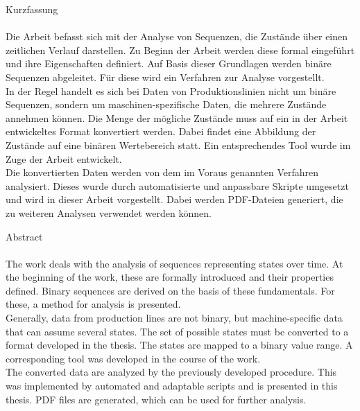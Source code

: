 
{\huge Kurzfassung}
\\
\\

Die Arbeit befasst sich mit der Analyse von Sequenzen, die Zustände über einen zeitlichen Verlauf darstellen.
Zu Beginn der Arbeit werden diese formal eingeführt und ihre Eigenschaften definiert.
Auf Basis dieser Grundlagen werden binäre Sequenzen abgeleitet.
Für diese wird ein Verfahren zur Analyse vorgestellt.\\
In der Regel handelt es sich bei Daten von Produktionslinien nicht um binäre Sequenzen, sondern um maschinen-spezifische Daten, die mehrere Zustände annehmen können.
Die Menge der mögliche Zustände muss auf ein in der Arbeit entwickeltes Format konvertiert werden.
Dabei findet eine Abbildung der Zustände auf eine binären Wertebereich statt.
Ein entsprechendes Tool wurde im Zuge der Arbeit entwickelt.\\
Die konvertierten Daten werden von dem im Voraus genannten Verfahren analysiert.
Dieses wurde durch automatisierte und anpassbare Skripte umgesetzt und wird in dieser Arbeit vorgestellt. 
Dabei werden PDF-Dateien generiert, die zu weiteren Analysen verwendet werden können.
\newpage


{\huge Abstract}
\\
\\

The work deals with the analysis of sequences representing states over time.
At the beginning of the work, these are formally introduced and their properties defined.
Binary sequences are derived on the basis of these fundamentals.
For these, a method for analysis is presented.\\
Generally, data from production lines are not binary, but machine-specific data that can assume several states.
The set of possible states must be converted to a format developed in the thesis.
The states are mapped to a binary value range.
A corresponding tool was developed in the course of the work.\\
The converted data are analyzed by the previously developed procedure.
This was implemented by automated and adaptable scripts and is presented in this thesis.
PDF files are generated, which can be used for further analysis.

\newpage